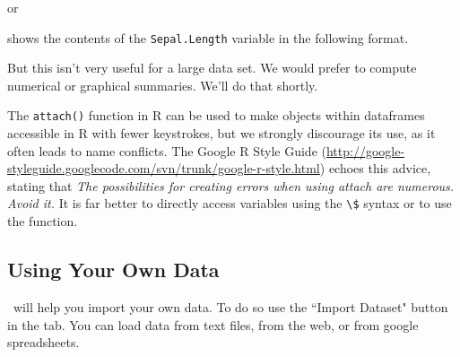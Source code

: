 or 
\begin{knitrout}
\end{knitrout}

shows the contents of the \verb!Sepal.Length! variable in the following format.
\begin{knitrout}
\end{knitrout}


But this isn't very useful for a large data set.  
We would prefer to compute numerical or graphical summaries.  We'll do that shortly.

The \verb!attach()! function in R can be used to make objects within dataframes
accessible in R with fewer keystrokes, but we strongly discourage its use, as
it often leads to name conflicts.  
The Google R Style Guide
(\url{http://google-styleguide.googlecode.com/svn/trunk/google-r-style.html})
echoes this advice, stating that \emph{The possibilities for creating errors
when using attach are numerous. Avoid it.} 
It is far better to directly access
variables using the \verb!\$! syntax or to use the  function.

\subsection{Using Your Own Data}
\Rstudio\ will help you import your own data.  To do so use the ``Import Dataset" 
button in the  tab.  You can load data from text files, from the web, or from
google spreadsheets.   

